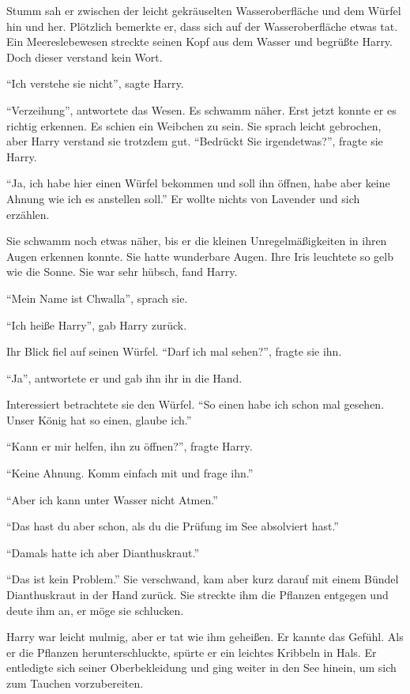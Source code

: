 Stumm sah er zwischen der leicht gekräuselten Wasseroberfläche und dem Würfel hin und her. Plötzlich bemerkte er, dass sich auf der Wasseroberfläche etwas tat. Ein Meereslebewesen streckte seinen Kopf aus dem Wasser und begrüßte Harry. Doch dieser verstand kein Wort.

\enquote{Ich verstehe sie nicht}, sagte Harry.

\enquote{Verzeihung}, antwortete das Wesen. Es schwamm näher. Erst jetzt konnte er es richtig erkennen. Es schien ein Weibchen zu sein. Sie sprach leicht gebrochen, aber Harry verstand sie trotzdem gut. \enquote{Bedrückt Sie irgendetwas?}, fragte sie Harry.

\enquote{Ja, ich habe hier einen Würfel bekommen und soll ihn öffnen, habe aber keine Ahnung wie ich es anstellen soll.} Er wollte nichts von Lavender und sich erzählen.

Sie schwamm noch etwas näher, bis er die kleinen Unregelmäßigkeiten in ihren Augen erkennen konnte. Sie hatte wunderbare Augen. Ihre Iris leuchtete so gelb wie die Sonne. Sie war sehr hübsch, fand Harry.

\enquote{Mein Name ist Chwalla}, sprach sie.

\enquote{Ich heiße Harry}, gab Harry zurück.

Ihr Blick fiel auf seinen Würfel. \enquote{Darf ich mal sehen?}, fragte sie ihn.

\enquote{Ja}, antwortete er und gab ihn ihr in die Hand.

Interessiert betrachtete sie den Würfel. \enquote{So einen habe ich schon mal gesehen. Unser König hat so einen, glaube ich.}

\enquote{Kann er mir helfen, ihn zu öffnen?}, fragte Harry.

\enquote{Keine Ahnung. Komm einfach mit und frage ihn.}

\enquote{Aber ich kann unter Wasser nicht Atmen.}

\enquote{Das hast du aber schon, als du die Prüfung im See absolviert hast.}

\enquote{Damals hatte ich aber Dianthuskraut.}

\enquote{Das ist kein Problem.} Sie verschwand, kam aber kurz darauf mit einem Bündel Dianthuskraut in der Hand zurück. Sie streckte ihm die Pflanzen entgegen und deute ihm an, er möge sie schlucken.

Harry war leicht mulmig, aber er tat wie ihm geheißen. Er kannte das Gefühl. Als er die Pflanzen herunterschluckte, spürte er ein leichtes Kribbeln in Hals. Er entledigte sich seiner Oberbekleidung und ging weiter in den See hinein, um sich zum Tauchen vorzubereiten.

